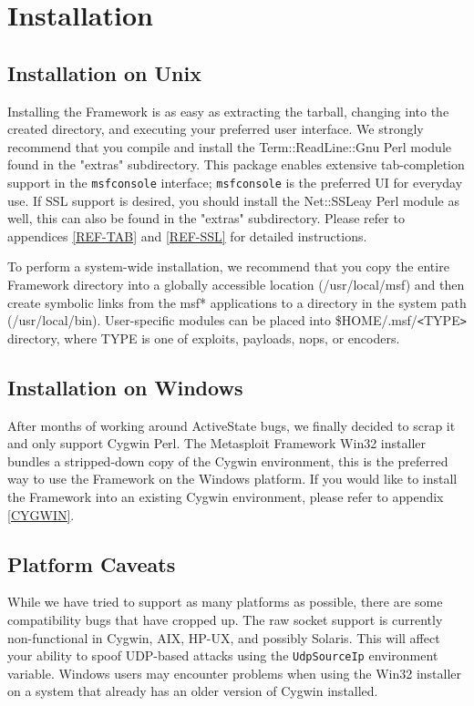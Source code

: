 \documentclass{report}
\begin{document}
\par
\pagebreak

\chapter{Installation}

    \section{Installation on Unix}
    \label{INSTALL-UNIX}
\par
Installing the Framework is as easy as extracting the tarball, changing into the
created directory, and executing your preferred user interface. We strongly
recommend that you compile and install the Term::ReadLine::Gnu Perl module found
in the "extras" subdirectory. This package enables extensive tab-completion
support in the \texttt{msfconsole} interface; \texttt{msfconsole} is the preferred UI for everyday
use.  If SSL support is desired, you should install the Net::SSLeay Perl module
as well, this can also be found in the "extras" subdirectory.  Please refer to 
appendices \ref{REF-TAB} and \ref{REF-SSL} for detailed instructions.

\par
To perform a system-wide installation, we recommend that you copy the entire
Framework directory into a globally accessible location (/usr/local/msf) and
then create symbolic links from the msf* applications to a directory in the
system path (/usr/local/bin). User-specific modules can be placed into
\$HOME/.msf/\verb#<#TYPE\verb#># directory, where TYPE is one of exploits,
payloads, nops, or encoders. 

    \section{Installation on Windows}
    \label{INSTALL-WIN32}
\par
After months of working around ActiveState bugs, we finally decided to scrap it
and only support Cygwin Perl. The Metasploit Framework Win32 installer bundles a
stripped-down copy of the Cygwin environment, this is the preferred way to use
the Framework on the Windows platform. If you would like to install the
Framework into an existing Cygwin environment, please refer to appendix
\ref{CYGWIN}.
   
    \section{Platform Caveats}
    \label{INSTALL-CAVEAT}
\par
While we have tried to support as many platforms as possible, there are some
compatibility bugs that have cropped up. The raw socket support is currently
non-functional in Cygwin, AIX, HP-UX, and possibly Solaris. This will affect
your ability to spoof UDP-based attacks using the \texttt{UdpSourceIp}
environment variable. Windows users may encounter problems when using the Win32
installer on a system that already has an older version of Cygwin installed. 
\end{document}
